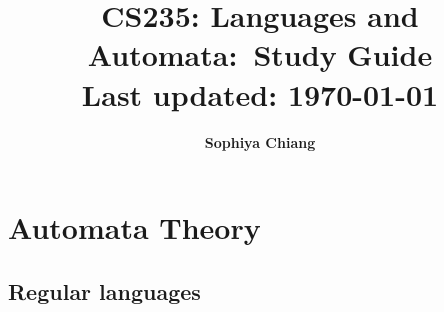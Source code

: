 \documentclass[11pt]{article}
\newcommand{\hmwkTitle}{Study Guide}
\newcommand{\hmwkClass}{CS235: Languages and Automata}
\newcommand{\hmwkAuthorName}{\textbf{Sophiya Chiang}}
\theoremstyle{definition}
\begin{document}
 

\title{
    \vspace{2in}
    \textmd{\textbf{\hmwkClass:\ \hmwkTitle}}\\
    \normalsize\vspace{0.1in}\small{Last updated: \today}\\
    \vspace{3in}
}

\author{\hmwkAuthorName}
\date{}

\maketitle

\pagebreak

\tableofcontents

\pagebreak

\section{Automata Theory}
\subsection{Regular languages}
\end{document}
